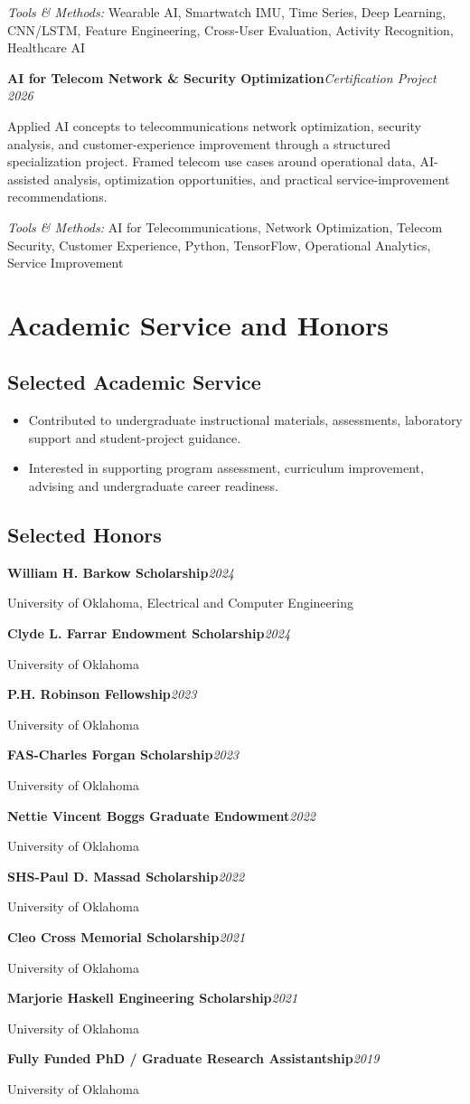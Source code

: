 \documentclass[8pt,letterpaper]{extarticle}
\newcommand{\entry}[2]{\Needspace{4\baselineskip}\textbf{#1}\hfill\textit{#2}\par}
\begin{document}
{\small\textit{Tools \& Methods:} Wearable AI, Smartwatch IMU, Time Series, Deep Learning, CNN/LSTM, Feature Engineering, Cross-User Evaluation, Activity Recognition, Healthcare AI\par}
\vspace{1pt}
\entry{AI for Telecom Network \& Security Optimization}{Certification Project \textbar{} 2026}
Applied AI concepts to telecommunications network optimization, security analysis, and customer-experience improvement through a structured specialization project. Framed telecom use cases around operational data, AI-assisted analysis, optimization opportunities, and practical service-improvement recommendations.\par
{\small\textit{Tools \& Methods:} AI for Telecommunications, Network Optimization, Telecom Security, Customer Experience, Python, TensorFlow, Operational Analytics, Service Improvement\par}
\vspace{1pt}
\section{Academic Service and Honors}
\subsection{Selected Academic Service}
\begin{itemize}
\item Contributed to undergraduate instructional materials, assessments, laboratory support and student-project guidance.
\item Interested in supporting program assessment, curriculum improvement, advising and undergraduate career readiness.
\end{itemize}
\subsection{Selected Honors}
\entry{William H. Barkow Scholarship}{2024}
{\small University of Oklahoma, Electrical and Computer Engineering\par}
\entry{Clyde L. Farrar Endowment Scholarship}{2024}
{\small University of Oklahoma\par}
\entry{P.H. Robinson Fellowship}{2023}
{\small University of Oklahoma\par}
\entry{FAS-Charles Forgan Scholarship}{2023}
{\small University of Oklahoma\par}
\entry{Nettie Vincent Boggs Graduate Endowment}{2022}
{\small University of Oklahoma\par}
\entry{SHS-Paul D. Massad Scholarship}{2022}
{\small University of Oklahoma\par}
\entry{Cleo Cross Memorial Scholarship}{2021}
{\small University of Oklahoma\par}
\entry{Marjorie Haskell Engineering Scholarship}{2021}
{\small University of Oklahoma\par}
\entry{Fully Funded PhD / Graduate Research Assistantship}{2019}
{\small University of Oklahoma\par}
\end{document}
